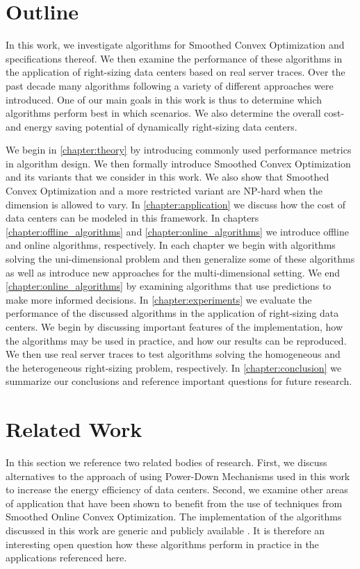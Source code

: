 \section{Outline}

In this work, we investigate algorithms for Smoothed Convex Optimization and specifications thereof. We then examine the performance of these algorithms in the application of right-sizing data centers based on real server traces. Over the past decade many algorithms following a variety of different approaches were introduced. One of our main goals in this work is thus to determine which algorithms perform best in which scenarios. We also determine the overall cost- and energy saving potential of dynamically right-sizing data centers.

We begin in \autoref{chapter:theory} by introducing commonly used performance metrics in algorithm design. We then formally introduce Smoothed Convex Optimization and its variants that we consider in this work. We also show that Smoothed Convex Optimization and a more restricted variant are NP-hard when the dimension is allowed to vary. In \autoref{chapter:application} we discuss how the cost of data centers can be modeled in this framework. In chapters \ref{chapter:offline_algorithms} and \ref{chapter:online_algorithms} we introduce offline and online algorithms, respectively. In each chapter we begin with algorithms solving the uni-dimensional problem and then generalize some of these algorithms as well as introduce new approaches for the multi-dimensional setting. We end \autoref{chapter:online_algorithms} by examining algorithms that use predictions to make more informed decisions. In \autoref{chapter:experiments} we evaluate the performance of the discussed algorithms in the application of right-sizing data centers. We begin by discussing important features of the implementation, how the algorithms may be used in practice, and how our results can be reproduced. We then use real server traces to test algorithms solving the homogeneous and the heterogeneous right-sizing problem, respectively. In \autoref{chapter:conclusion} we summarize our conclusions and reference important questions for future research.

\section{Related Work}

In this section we reference two related bodies of research. First, we discuss alternatives to the approach of using Power-Down Mechanisms used in this work to increase the energy efficiency of data centers. Second, we examine other areas of application that have been shown to benefit from the use of techniques from Smoothed Online Convex Optimization. The implementation of the algorithms discussed in this work are generic and publicly available \cite{Hübotter2021}. It is therefore an interesting open question how these algorithms perform in practice in the applications referenced here.

